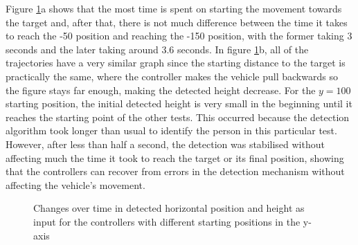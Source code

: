 Figure \ref{fig:validate-yaw}a shows that the most time is spent on starting the movement towards the target and, after that, there is not much difference between the time it takes to reach the -50 position and reaching the -150 position, with the former taking 3 seconds and the later taking around 3.6 seconds.
In figure \ref{fig:validate-yaw}b, all of the trajectories have a very similar graph since the starting distance to the target is practically the same, where the controller makes the vehicle pull backwards so the figure stays far enough, making the detected height decrease.
For the $y=100$ starting position, the initial detected height is very small in the beginning until it reaches the starting point of the other tests.
This occurred because the detection algorithm took longer than usual to identify the person in this particular test.
However, after less than half a second, the detection was stabilised without affecting much the time it took to reach the target or its final position, showing that the controllers can recover from errors in the detection mechanism without affecting the vehicle's movement.


\begin{figure}
  \centering
  \caption{Changes over time in detected horizontal position and height as input for the controllers with different starting positions in the y-axis}
  \label{fig:validate-yaw}
\end{figure}

